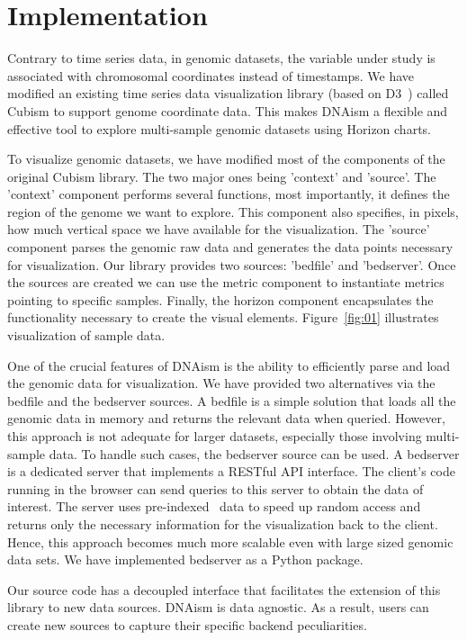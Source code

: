 \documentclass[twocolumn]{bmcart}
\begin{document}
\section*{Implementation}

Contrary to time series data, in genomic datasets, the variable under study is
associated with chromosomal coordinates instead of timestamps. We have modified
an existing time series data visualization library (based on D3~\cite{2011-d3})
called Cubism to support genome coordinate data. This makes DNAism
a flexible and effective tool to explore multi-sample genomic datasets using
Horizon charts.

To visualize genomic datasets, we have modified most of the components of the
original Cubism library.  The two major ones being 'context' and
'source'.  The 'context' component performs several functions, most
importantly, it defines the region of the genome we want to explore. This
component also specifies, in pixels, how much vertical space we have available
for the visualization.  The 'source' component parses the genomic raw data and
generates the data points necessary for visualization. Our library provides two
sources: 'bedfile' and 'bedserver'. Once the sources are created we can use the
metric component to instantiate metrics pointing to specific samples.  Finally,
the horizon component encapsulates the functionality necessary to create the
visual elements. Figure~\ref{fig:01} illustrates visualization of sample data.

One of the crucial features of DNAism is the ability to efficiently parse and
load the genomic data for visualization. We have provided two alternatives via
the bedfile and the bedserver sources. A bedfile is a simple solution that
loads all the genomic data in memory and returns the relevant data when
queried.  However, this approach is not adequate for larger datasets,
especially those involving multi-sample data. To handle such cases, the
bedserver source can be used. A bedserver is a dedicated server that
implements a RESTful API interface. The client's code running in the browser
can send queries to this server to obtain the data of interest.  The server
uses pre-indexed~\cite{tabix-li} data to speed up random access and returns
only the necessary information for the visualization back to the client.
Hence, this approach becomes much more scalable even with large sized genomic
data sets. We have implemented bedserver as a Python package.

Our source code has a decoupled interface that facilitates the extension of
this library to new data sources. DNAism is data agnostic. As a result, users
can create new sources to capture their specific backend peculiarities.
\end{document}
